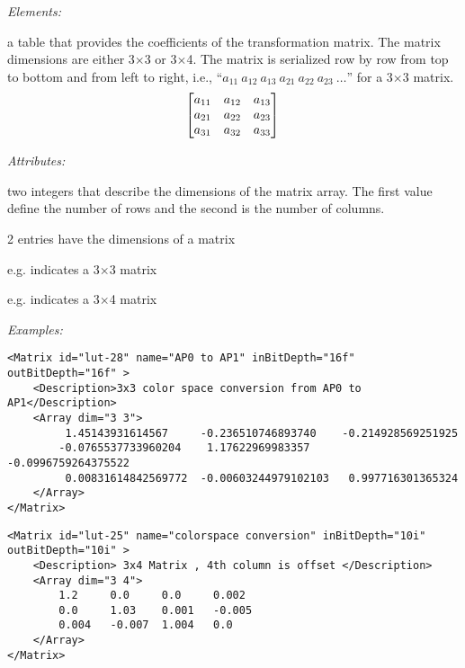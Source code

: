 
\emph{Elements:}
\begin{xmlfields}
	\xmlitem[Array][required] 
	a table that provides the coefficients of the transformation matrix. The matrix dimensions are either 3$\times$3 or 3$\times$4. The matrix is serialized row by row from top to bottom and from left to right, i.e., ``$a_{11}\ a_{12}\ a_{13}\ a_{21}\ a_{22}\ a_{23}\ \ldots$'' for a 3$\times$3 matrix.
		\begin{equation}
		    \begin{bmatrix*}
		        a_{11} & a_{12} & a_{13} \\
		        a_{21} & a_{22} & a_{23} \\
		        a_{31} & a_{32} & a_{33} \\
		    \end{bmatrix*} \\
		\end{equation}

    \emph{Attributes:}
    \begin{xmlfields}            
    	\xmlitem[dim][required] 
    	two integers that describe the dimensions of the matrix array. The first value define the number of rows and the second is the number of columns. 
    	
    	2 entries have the dimensions of a matrix
		\begin{list}{}{\setlength{\itemsep}{4pt}\setlength{\topsep}{0pt}}
				\item e.g.  indicates a 3$\times$3 matrix
				\item e.g.  indicates a 3$\times$4 matrix
		\end{list}
	\end{xmlfields}

	
\end{xmlfields}


\emph{Examples:}
\begin{lstlisting}[caption=Example of a \xml{Matrix} node with \xml{dim="3 3 3"}]
<Matrix id="lut-28" name="AP0 to AP1" inBitDepth="16f" outBitDepth="16f" >
	<Description>3x3 color space conversion from AP0 to AP1</Description>
	<Array dim="3 3">
         1.45143931614567	  -0.236510746893740	-0.214928569251925
        -0.0765537733960204    1.17622969983357	    -0.0996759264375522
         0.00831614842569772  -0.00603244979102103   0.997716301365324
	</Array>
</Matrix>
\end{lstlisting}

\begin{lstlisting}[caption=Example of a \xml{Matrix} node]
<Matrix id="lut-25" name="colorspace conversion" inBitDepth="10i" outBitDepth="10i" >
	<Description> 3x4 Matrix , 4th column is offset </Description>
	<Array dim="3 4">
		1.2  	0.0  	0.0   	0.002
		0.0 	1.03 	0.001 	-0.005
		0.004 	-0.007 	1.004  	0.0
	</Array>
</Matrix>
\end{lstlisting}